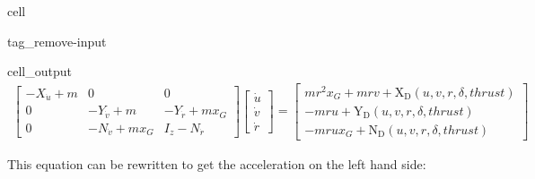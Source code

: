 \documentclass[review]{elsarticle}
\begin{document}
\begin{sphinxuseclass}{cell}
\begin{sphinxuseclass}{tag_remove-input}
\begin{sphinxuseclass}{cell_output}\begin{equation*}
\begin{split}\displaystyle \left[\begin{matrix}- X_{\dot{u}} + m & 0 & 0\\0 & - Y_{\dot{v}} + m & - Y_{\dot{r}} + m x_{G}\\0 & - N_{\dot{v}} + m x_{G} & I_{z} - N_{\dot{r}}\end{matrix}\right] \left[\begin{matrix}\dot{u}\\\dot{v}\\\dot{r}\end{matrix}\right] = \left[\begin{matrix}m r^{2} x_{G} + m r v + \operatorname{X_{D}}{\left(u,v,r,\delta,thrust \right)}\\- m r u + \operatorname{Y_{D}}{\left(u,v,r,\delta,thrust \right)}\\- m r u x_{G} + \operatorname{N_{D}}{\left(u,v,r,\delta,thrust \right)}\end{matrix}\right]\end{split}
\end{equation*}
\end{sphinxuseclass}
\end{sphinxuseclass}
\end{sphinxuseclass}
\sphinxAtStartPar
This equation can be rewritten to get the acceleration on the left hand side:
\end{document}
